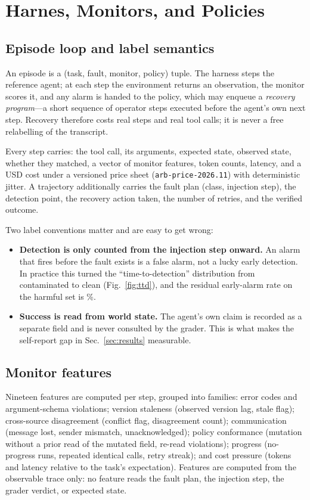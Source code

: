 \section{Harnes, Monitors, and Policies}\label{sec:method}

\subsection{Episode loop and label semantics}

An episode is a (task, fault, monitor, policy) tuple. The harness steps the reference agent; at each
step the environment returns an observation, the monitor scores it, and any alarm is handed to the
policy, which may enqueue a \emph{recovery program}---a short sequence of operator steps executed
before the agent's own next step. Recovery therefore costs real steps and real tool calls; it is
never a free relabelling of the transcript.

Every step carries: the tool call, its arguments, expected state, observed state, whether they
matched, a vector of monitor features, token counts, latency, and a USD cost under a versioned price
sheet (\texttt{arb-price-2026.11}) with deterministic jitter. A trajectory additionally carries the
fault plan (class, injection step), the detection point, the recovery action taken, the number of
retries, and the verified outcome.

Two label conventions matter and are easy to get wrong:

\begin{itemize}
\item \textbf{Detection is only counted from the injection step onward.} An alarm that fires before
the fault exists is a false alarm, not a lucky early detection. In practice this turned the
``time-to-detection'' distribution from contaminated to clean (Fig.~\ref{fig:ttd}), and the residual
early-alarm rate on the harmful set is \EarlyAlarmRate\%.
\item \textbf{Success is read from world state.} The agent's own claim is recorded as a separate
field and is never consulted by the grader. This is what makes the self-report gap in
Sec.~\ref{sec:results} measurable.
\end{itemize}

\subsection{Monitor features}

Nineteen features are computed per step, grouped into families: error codes and argument-schema
violations; version staleness (observed version lag, stale flag); cross-source disagreement
(conflict flag, disagreement count); communication (message lost, sender mismatch, unacknowledged);
policy conformance (mutation without a prior read of the mutated field, re-read violations);
progress (no-progress runs, repeated identical calls, retry streak); and cost pressure
(tokens and latency relative to the task's expectation). Features are computed from the observable
trace only: no feature reads the fault plan, the injection step, the grader verdict, or expected
state.

